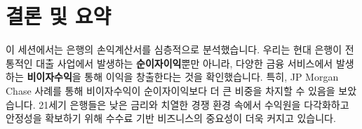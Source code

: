 \documentclass[11pt,a4paper]{article}
\begin{document}
\newpage
\section*{결론 및 요약}

\begin{summarybox}[title={핵심 정리}]
이 세션에서는 은행의 손익계산서를 심층적으로 분석했습니다. 우리는 현대 은행이 전통적인 대출 사업에서 발생하는 \textbf{순이자이익}뿐만 아니라, 다양한 금융 서비스에서 발생하는 \textbf{비이자수익}을 통해 이익을 창출한다는 것을 확인했습니다. 특히, JP Morgan Chase 사례를 통해 비이자수익이 순이자이익보다 더 큰 비중을 차지할 수 있음을 보았습니다. 21세기 은행들은 낮은 금리와 치열한 경쟁 환경 속에서 수익원을 다각화하고 안정성을 확보하기 위해 수수료 기반 비즈니스의 중요성이 더욱 커지고 있습니다.
\end{summarybox}
\end{document}
